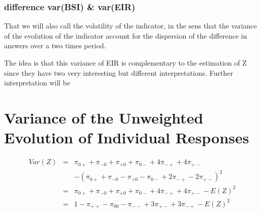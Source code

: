 \documentclass[12pt,a4paper,oneside]{book}
\begin{document}
\subsubsection{difference var(BSI) \& var(EIR)}

That we will also call the volatility of the indicator, in the sens that the variance of the evolution of the indicator account for the dispersion of the difference in answers over a two times period.


The idea is that this variance of EIR is complementary to the estimation of Z since they have two very interesting but different interpretations.
Further interpretation will be 

\section{Variance of the Unweighted Evolution of Individual Responses}




\begin{eqnarray}
Var(Z) &=& \pi_{0+} + \pi_{-0} + \pi_{+0} + \pi_{0-} +4\pi_{-+} +4\pi_{+-} \nonumber \nonumber \\ 
&&	- (\pi_{0+} + \pi_{-0} - \pi_{+0} - \pi_{0-} +2\pi_{-+} -2\pi_{+-})^2 \nonumber \\
&=& \pi_{0+} + \pi_{-0} + \pi_{+0} + \pi_{0-} +4\pi_{-+} +4\pi_{+-} - E(Z)^2 \nonumber \\
&=& 1 - \pi_{++} - \pi_{00} - \pi_{--} + 3\pi_{+-} + 3\pi_{-+} - E(Z)^2
\end{eqnarray}
\end{document}
